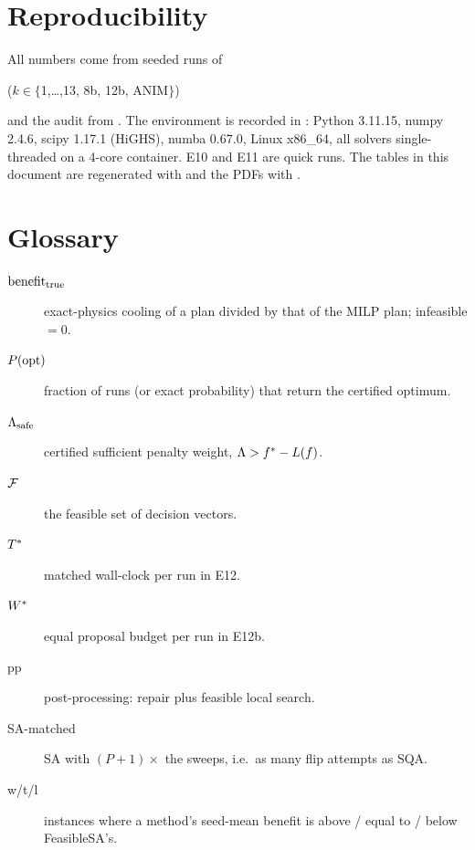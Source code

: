 \documentclass[11pt,a4paper]{report}
\begin{document}
\section{Reproducibility}
All numbers come from seeded runs of
\begin{center}\quad ($k\in\{$1,\dots,13, 8b, 12b, ANIM$\}$)\end{center}
and the audit from . The environment is recorded in
: Python 3.11.15, numpy 2.4.6, scipy 1.17.1 (HiGHS), numba 0.67.0, Linux
x86\_64, all solvers single-threaded on a 4-core container. E10 and E11 are quick runs. The tables
in this document are regenerated with  and the PDFs with
.

\section{Glossary}

\begin{description}
\item[$\mathrm{benefit}_{\mathrm{true}}$] exact-physics cooling of a plan divided by that of the MILP plan; infeasible $=0$.
\item[$P(\mathrm{opt})$] fraction of runs (or exact probability) that return the certified optimum.
\item[$\Lambda_{\mathrm{safe}}$] certified sufficient penalty weight, $\Lambda>f^\ast-L(f)$.
\item[$\mathcal{F}$] the feasible set of decision vectors.
\item[$T^{\ast}$] matched wall-clock per run in E12.
\item[$W^{\ast}$] equal proposal budget per run in E12b.
\item[pp] post-processing: repair plus feasible local search.
\item[SA-matched] SA with $(P{+}1)\times$ the sweeps, i.e.\ as many flip attempts as SQA.
\item[w/t/l] instances where a method's seed-mean benefit is above / equal to / below FeasibleSA's.
\end{description}
\end{document}
